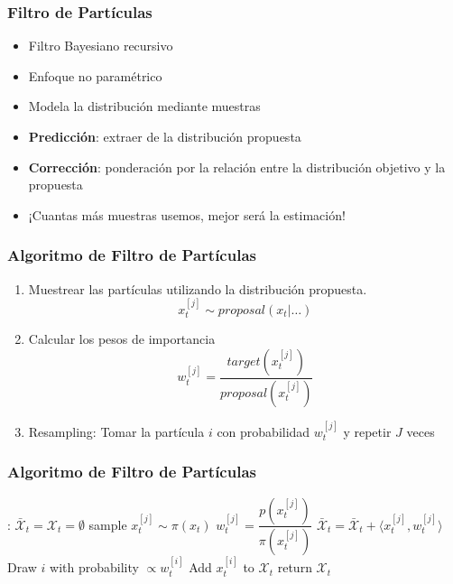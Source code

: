 \begin{frame}
    \frametitle{Filtro de Partículas}

    \begin{itemize}
        \item Filtro Bayesiano recursivo
        \item Enfoque no paramétrico
        \item Modela la distribución mediante muestras
        \item \textbf{Predicción}: extraer de la distribución propuesta
        \item \textbf{Corrección}: ponderación por la relación entre la distribución objetivo y la propuesta
        \item \alert{¡Cuantas más muestras usemos, mejor será la estimación!}
    \end{itemize}
\end{frame}
    
\begin{frame}
    \frametitle{Algoritmo de Filtro de Partículas}

    \begin{enumerate}
        \item Muestrear las partículas utilizando la distribución propuesta.
        \begin{equation*}
            x_t^{[j]} \sim proposal(x_t | \ldots)
        \end{equation*}
        \item Calcular los pesos de importancia
        \begin{equation*}
            w_t^{[j]} = \frac{target(x_t^{[j]})}{proposal(x_t^{[j]})}
        \end{equation*}
        \item Resampling: Tomar la partícula $i$ con probabilidad $w_t^{[j]}$ y repetir $J$ veces 
    \end{enumerate}
\end{frame}

\begin{frame}
    \frametitle{Algoritmo de Filtro de Partículas}

    \begin{algorithmic}[1]
    :
    \State $\bar{\mathcal{X}}_t = \mathcal{X}_t = \emptyset$
        \State sample $x_t^{[j]} \sim \pi(x_t)$
        \State $w_t^{[j]} = \dfrac{p(x_t^{[j]})}{\pi(x_{t}^{[j]})}$
        \State $\bar{\mathcal{X}}_t = \bar{\mathcal{X}}_t + \langle x_t^{[j]}, w_t^{[j]}\rangle$
    \EndFor
        \State Draw $i$ with probability $\propto w_t^{[i]}$
        \State Add $x_t^{[i]}$ to $\mathcal{X}_t$
    \EndFor
    \State return $\mathcal{X}_t$
    \EndProcedure
    \end{algorithmic}
\end{frame}


